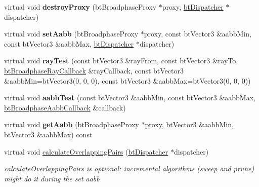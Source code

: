 \begin{DoxyCompactItemize}
\item 
\mbox{\label{structbtDbvtBroadphase_a3d5009787a1f8dc5ef992afaf34ee922}} 
virtual void {\bfseries destroy\+Proxy} (bt\+Broadphase\+Proxy $\ast$proxy, \hyperlink{classbtDispatcher}{bt\+Dispatcher} $\ast$dispatcher)
\item 
\mbox{\label{structbtDbvtBroadphase_a0cd9b8784d5d3acb7298d18a7c527a32}} 
virtual void {\bfseries set\+Aabb} (bt\+Broadphase\+Proxy $\ast$proxy, const bt\+Vector3 \&aabb\+Min, const bt\+Vector3 \&aabb\+Max, \hyperlink{classbtDispatcher}{bt\+Dispatcher} $\ast$dispatcher)
\item 
\mbox{\label{structbtDbvtBroadphase_a26d90870292fb6770eeb7255512a9dec}} 
virtual void {\bfseries ray\+Test} (const bt\+Vector3 \&ray\+From, const bt\+Vector3 \&ray\+To, \hyperlink{structbtBroadphaseRayCallback}{bt\+Broadphase\+Ray\+Callback} \&ray\+Callback, const bt\+Vector3 \&aabb\+Min=bt\+Vector3(0, 0, 0), const bt\+Vector3 \&aabb\+Max=bt\+Vector3(0, 0, 0))
\item 
\mbox{\label{structbtDbvtBroadphase_aa93650798174403308a13a4b906b65bb}} 
virtual void {\bfseries aabb\+Test} (const bt\+Vector3 \&aabb\+Min, const bt\+Vector3 \&aabb\+Max, \hyperlink{structbtBroadphaseAabbCallback}{bt\+Broadphase\+Aabb\+Callback} \&callback)
\item 
\mbox{\label{structbtDbvtBroadphase_a8d7f1734cf9e4dc426b2540b6ba659fb}} 
virtual void {\bfseries get\+Aabb} (bt\+Broadphase\+Proxy $\ast$proxy, bt\+Vector3 \&aabb\+Min, bt\+Vector3 \&aabb\+Max) const
\item 
\mbox{\label{structbtDbvtBroadphase_a809b52bba595445a4d4343d322545932}} 
virtual void \hyperlink{structbtDbvtBroadphase_a809b52bba595445a4d4343d322545932}{calculate\+Overlapping\+Pairs} (\hyperlink{classbtDispatcher}{bt\+Dispatcher} $\ast$dispatcher)
\begin{DoxyCompactList}\small\item\em calculate\+Overlapping\+Pairs is optional\+: incremental algorithms (sweep and prune) might do it during the set aabb \end{DoxyCompactList}\item 

\end{DoxyCompactItemize}
